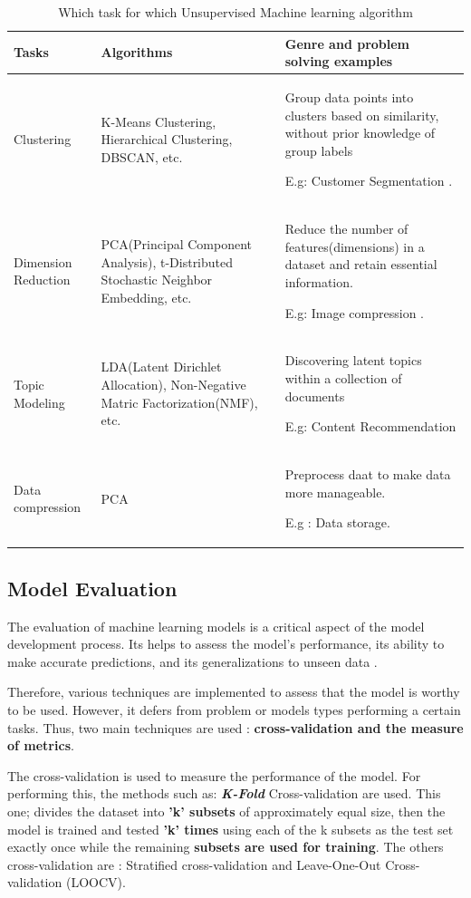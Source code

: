 \documentclass[12pt,a4paper]{report}
\begin{document}
\renewcommand{\arraystretch}{1.2}
\begin{table}[h]
	\begin{tabular}{p{3cm}p{5.6cm}p{6cm}} 
		
		\toprule 
		Tasks & Algorithms & Genre and problem solving examples    \\
		\toprule
		Clustering & K-Means Clustering, Hierarchical Clustering, DBSCAN, etc. & Group data points into clusters based on similarity, without prior knowledge of group labels
		
		E.g: Customer Segmentation . \\
		
		Dimension Reduction & PCA(Principal Component Analysis), t-Distributed Stochastic Neighbor Embedding, etc. & Reduce the number of features(dimensions) in a dataset and retain essential information.
		
		E.g: Image compression .\\
		Topic Modeling & LDA(Latent Dirichlet Allocation), Non-Negative Matric Factorization(NMF), etc. & Discovering latent topics within a collection of documents
		
		E.g: Content Recommendation \\
		
		Data compression & PCA & Preprocess daat to make data more manageable.
		
		E.g : Data storage.\\
						
		\bottomrule
	\end{tabular} 
	\caption{Which task for which Unsupervised Machine learning algorithm} 
	\label{whichTaskWhichModelUnsupervised} 
\end{table}  


\subsection{Model Evaluation}
The evaluation of machine learning models is a critical aspect of the model development process. Its helps to assess the model's performance, its ability to make accurate predictions, and its generalizations to unseen data \cite{raschka2018model}. 

Therefore, various techniques are implemented to assess that the model is worthy to be used. However, it defers from problem or models types performing a certain tasks. Thus, two main techniques are used : \textbf{cross-validation and the measure of metrics}.

The cross-validation is used to measure the performance of the model. For performing this, the methods such as: \textbf{\textit{K-Fold}} Cross-validation are used. This one; divides the dataset into \textbf{'k' subsets }of approximately equal size, then the model is trained and tested \textbf{'k' times} using each of the k subsets as the test set exactly once while the remaining \textbf{subsets are used for training}. The others cross-validation are : Stratified cross-validation and Leave-One-Out Cross-validation (LOOCV). 
\end{document}
